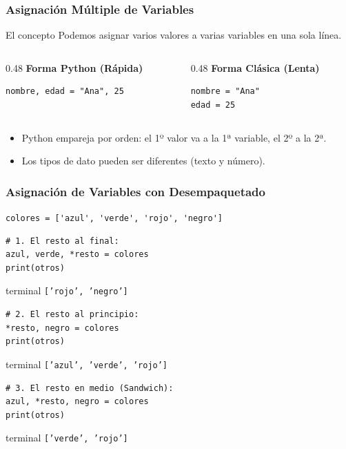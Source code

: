\documentclass[11pt]{beamer}
\newcommand{\terminal}[1]{
    \vspace{-0.2em}
    \begin{beamercolorbox}[wd=\linewidth, sep=0.3em, rounded=false, shadow=false]{terminal}
    \texttt{#1}
    \end{beamercolorbox}
    \vspace{0.2em}
}
\begin{document}
\begin{frame}[fragile]\frametitle{Asignación Múltiple de Variables}
\begin{block}{El concepto}
Podemos asignar varios valores a varias variables en una sola línea.
\end{block}

\begin{columns}
\begin{column}{0.48\textwidth}
\textbf{Forma Python (Rápida)}
\begin{lstlisting}[basicstyle=\tiny]
nombre, edad = "Ana", 25
\end{lstlisting}
\end{column}

\begin{column}{0.48\textwidth}
\textbf{Forma Clásica (Lenta)}
\begin{lstlisting}
nombre = "Ana"
edad = 25
\end{lstlisting}
\end{column}
\end{columns}

\vspace{0.5cm}
\begin{itemize}
\item Python empareja por orden: el 1º valor va a la 1ª variable, el 2º a la 2ª.
\item Los tipos de dato pueden ser diferentes (texto y número).
\end{itemize}
\end{frame}

\begin{frame}[fragile]\frametitle{Asignación de Variables con Desempaquetado}
\lstinline|colores = ['azul', 'verde', 'rojo', 'negro']|
\begin{lstlisting}[basicstyle=\scriptsize]
# 1. El resto al final:
azul, verde, *resto = colores
print(otros)
\end{lstlisting}
\terminal{['rojo', 'negro']}
\begin{lstlisting}[basicstyle=\scriptsize]
# 2. El resto al principio:
*resto, negro = colores
print(otros)
\end{lstlisting}
\terminal{['azul', 'verde', 'rojo']}
\begin{lstlisting}[basicstyle=\scriptsize]
# 3. El resto en medio (Sandwich):
azul, *resto, negro = colores
print(otros)
\end{lstlisting}
\terminal{['verde', 'rojo']}
\end{frame}
\end{document}
